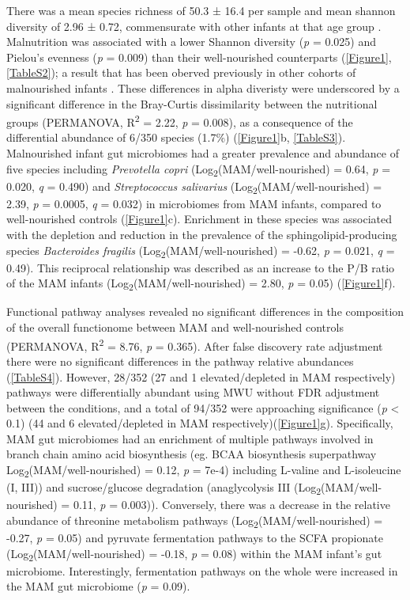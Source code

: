 \documentclass{article}
\begin{document}
There was a mean species richness of 50.3 ± 16.4 per sample and mean shannon diversity of 2.96 ± 0.72, commensurate with other infants at that age group \cite{niu2020evolution}.
Malnutrition was associated with a lower Shannon diversity (\textit{p} = 0.025) and Pielou's evenness (\textit{p} = 0.009) than their well-nourished counterparts (\autoref{Figure1}, \autoref{TableS2}); a result that has been oberved previously in other cohorts of malnourished infants \cite{roger2022impact}.
These differences in alpha diveristy were underscored by a significant difference in the Bray-Curtis dissimilarity between the nutritional groups (\gls{PERMANOVA}, R\textsuperscript{2} = 2.22, \textit{p} = 0.008), as a consequence of the differential abundance of 6/350 species (1.7\%) (\autoref{Figure1}b, \autoref{TableS3}).
Malnourished infant gut microbiomes had a greater prevalence and abundance of five species including \textit{Prevotella copri} (Log\textsubscript{2}(\gls{MAM}/well-nourished) = 0.64, \textit{p} = 0.020, \textit{q} = 0.490) and \textit{Streptococcus salivarius} (Log\textsubscript{2}(\gls{MAM}/well-nourished) = 2.39, \textit{p} = 0.0005, \textit{q} = 0.032) in microbiomes from \gls{MAM} infants, compared to well-nourished controls (\autoref{Figure1}c).
Enrichment in these species was associated with the depletion and reduction in the prevalence of the sphingolipid-producing species \textit{Bacteroides fragilis} (Log\textsubscript{2}(\gls{MAM}/well-nourished) = -0.62, \textit{p} = 0.021, \textit{q} = 0.49).
This reciprocal relationship was described as an increase to the \gls{P/B} ratio of the \gls{MAM} infants (Log\textsubscript{2}(\gls{MAM}/well-nourished) = 2.80, \textit{p} = 0.05) (\autoref{Figure1}f).

Functional pathway analyses revealed no significant differences  in the composition of the overall functionome between \gls{MAM} and well-nourished controls (PERMANOVA, R\textsuperscript{2} = 8.76, \textit{p} = 0.365).
After false discovery rate adjustment there were no significant differences in the pathway relative abundances (\autoref{TableS4}).
However, 28/352 (27 and 1 elevated/depleted in \gls{MAM} respectively) pathways were differentially abundant using \gls{MWU} without FDR adjustment between the conditions, and a total of 94/352 were approaching significance (\textit{p} \textless{} 0.1) (44 and 6 elevated/depleted in \gls{MAM} respectively)(\autoref{Figure1}g).
Specifically, \gls{MAM} gut microbiomes had an enrichment of multiple pathways involved in branch chain amino acid biosynthesis (eg. BCAA biosynthesis superpathway Log\textsubscript{2}(\gls{MAM}/well-nourished) = 0.12, \textit{p} = 7e-4) including L-valine and L-isoleucine (I, III)) and sucrose/glucose degradation (anaglycolysis III (Log\textsubscript{2}(\gls{MAM}/well-nourished) = 0.11, \textit{p} = 0.003)).
Conversely, there was a decrease in the relative abundance of threonine metabolism pathways (Log\textsubscript{2}(\gls{MAM}/well-nourished) = -0.27, \textit{p} = 0.05) and pyruvate fermentation pathways to the \gls{SCFA} propionate (Log\textsubscript{2}(\gls{MAM}/well-nourished) = -0.18, \textit{p} = 0.08) within the \gls{MAM} infant's gut microbiome.
Interestingly, fermentation pathways on the whole were increased in the \gls{MAM} gut microbiome (\textit{p} = 0.09).
\end{document}
